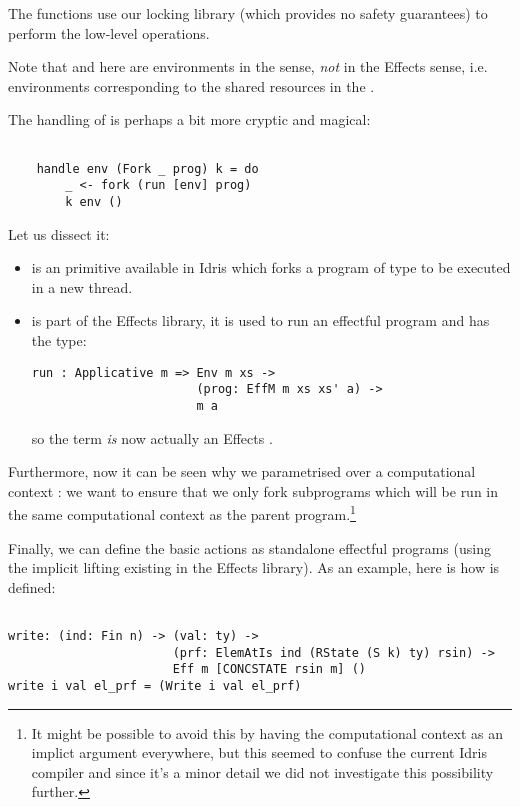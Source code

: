 The  functions use our locking library (which provides no safety
guarantees) to perform the low-level operations.

Note that  and  here are environments in the
 sense, \emph{not} in the Effects sense, i.e. environments
corresponding to the shared resources in the .

The handling of  is perhaps a bit more cryptic and magical:

\begin{BVerbatim}

    handle env (Fork _ prog) k = do
        _ <- fork (run [env] prog)
        k env ()

\end{BVerbatim}

Let us dissect it:

\begin{itemize}
    \item {} is an  primitive available in Idris which forks
        a program of type  to be executed in a new thread.
    \item {} is part of the Effects library, it is used to run an
    effectful program and has the type:
    \begin{Verbatim}
run : Applicative m => Env m xs ->
                       (prog: EffM m xs xs' a) ->
                       m a
    \end{Verbatim}
    so the term \code{[env]} \emph{is} now actually an Effects .
\end{itemize}

Furthermore, now it can be seen why we parametrised  over
a computational context : we want to ensure that we only
fork  subprograms which will be run in the same computational
context as the parent  program.\footnote{It might be possible to avoid
this by having the computational context as an implict argument everywhere, but
this seemed to confuse the current Idris compiler and since it's a minor detail
we did not investigate this possibility further.}

Finally, we can define the basic actions as standalone effectful programs
(using the implicit lifting existing in the Effects library).
As an example, here is how  is defined:

\begin{BVerbatim}

write: (ind: Fin n) -> (val: ty) ->
                       (prf: ElemAtIs ind (RState (S k) ty) rsin) ->
                       Eff m [CONCSTATE rsin m] ()
write i val el_prf = (Write i val el_prf)

\end{BVerbatim}

